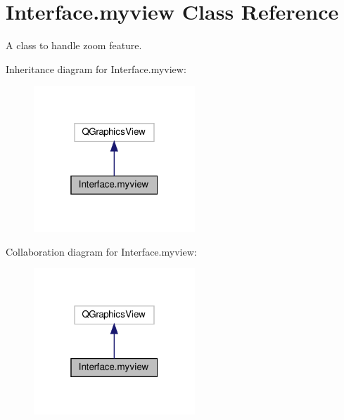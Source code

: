 \hypertarget{classInterface_1_1myview}{}\section{Interface.\+myview Class Reference}
\label{classInterface_1_1myview}


A class to handle zoom feature.  




Inheritance diagram for Interface.\+myview\+:\nopagebreak
\begin{figure}[H]
\begin{center}
\leavevmode
\includegraphics[width=172pt]{classInterface_1_1myview__inherit__graph}
\end{center}
\end{figure}


Collaboration diagram for Interface.\+myview\+:\nopagebreak
\begin{figure}[H]
\begin{center}
\leavevmode
\includegraphics[width=172pt]{classInterface_1_1myview__coll__graph}
\end{center}
\end{figure}
